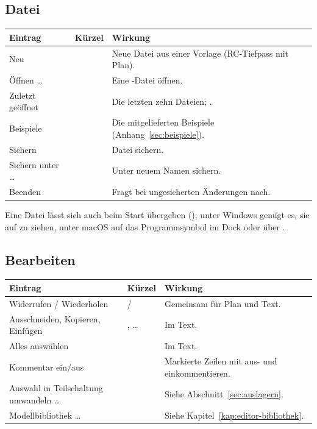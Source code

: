 \subsection*{Datei}
\begin{tabularx}{\textwidth}{@{}lP{3.5cm}L@{}}
  \toprule
  Eintrag & Kürzel & Wirkung \\
  \midrule
  Neu &  & Neue Datei aus einer Vorlage (RC-Tiefpass mit Plan). \\
  Öffnen \dots &  & Eine -Datei öffnen. \\
  Zuletzt geöffnet & & Die letzten zehn Dateien; . \\
  Beispiele & & Die mitgelieferten Beispiele (Anhang~\ref{sec:beispiele}). \\
  Sichern &  & Datei sichern. \\
  Sichern unter \dots &  & Unter neuem Namen sichern. \\
  Beenden &  & Fragt bei ungesicherten Änderungen nach. \\
  \bottomrule
\end{tabularx}

Eine Datei lässt sich auch beim Start übergeben
(); unter Windows genügt es, sie auf
 zu ziehen, unter macOS auf das Programmsymbol im
Dock oder über .

\subsection*{Bearbeiten}
\begin{tabularx}{\textwidth}{@{}lP{3.5cm}L@{}}
  \toprule
  Eintrag & Kürzel & Wirkung \\
  \midrule
  Widerrufen / Wiederholen &  /  & Gemeinsam für Plan und Text. \\
  Ausschneiden, Kopieren, Einfügen & , \dots{} & Im Text. \\
  Alles auswählen &  & Im Text. \\
  Kommentar ein/aus &  & Markierte Zeilen mit \code{//} aus- und einkommentieren. \\
  Auswahl in Teilschaltung umwandeln \dots &  & Siehe Abschnitt~\ref{sec:auslagern}. \\
  Modellbibliothek \dots &  & Siehe Kapitel~\ref{kap:editor-bibliothek}. \\
  \bottomrule
\end{tabularx}

